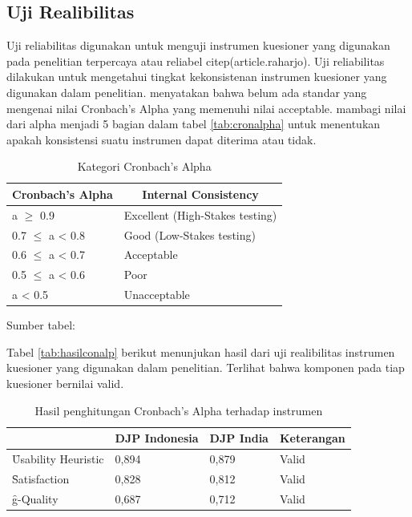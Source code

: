 \subsection{Uji Realibilitas}
Uji reliabilitas digunakan untuk menguji instrumen kuesioner yang digunakan pada penelitian terpercaya atau reliabel citep(article.raharjo). Uji reliabilitas dilakukan untuk mengetahui tingkat kekonsistenan instrumen kuesioner yang digunakan dalam penelitian. \citet{} menyatakan bahwa belum ada standar yang mengenai nilai Cronbach's Alpha yang memenuhi nilai acceptable. \citet{} mambagi nilai dari alpha menjadi 5 bagian dalam tabel \ref{tab:cronalpha} untuk menentukan apakah konsistensi suatu instrumen dapat diterima atau tidak.
\begin{table}
	\centering
	\caption{Kategori Cronbach's Alpha}
	\begin{tabular}{|l|l|}
		\hline
		\multicolumn{1}{|c|}{\bf Cronbach's Alpha} & \multicolumn{1}{c|}{{\bf Internal Consistency}} \\ \hline
		a $\geq$ 0.9 & Excellent (High-Stakes testing) \\ \hline
		0.7 $\leq$ a < 0.8 & Good (Low-Stakes testing) \\ \hline
		0.6 $\leq$ a < 0.7 & Acceptable  \\ \hline
		0.5 $\leq$ a < 0.6 & Poor   \\ \hline
		a < 0.5           & Unacceptable  \\ \hline 
	\end{tabular}
		\begin{center}
			{\small Sumber tabel: \citep{buku.george}}
		\end{center}
\end{table}
Tabel \ref{tab:hasilconalp} berikut menunjukan hasil dari uji realibilitas instrumen kuesioner yang digunakan dalam penelitian. Terlihat bahwa komponen pada tiap kuesioner bernilai valid.
\begin{table}
	\centering
	\caption{Hasil penghitungan Cronbach's Alpha terhadap instrumen}
	\begin{tabular}{|l|l|l|l|}
		\cline{2-4}
		\multicolumn{1}{c|}{} &
		\multicolumn{1}{l|}{\bf DJP Indonesia} &
		\multicolumn{1}{l|}{\bf DJP India} &
		\multicolumn{1}{l|}{{\bf Keterangan}} \\ \hline
		\f{Usability Heuristic} & 0,894
		 & 0,879 & Valid \\ \hline
		\f{Satisfaction} & 0,828
		& 0,812 & Valid \\ \hline
		\f{g-Quality} & 0,687
		 & 0,712 & Valid \\ \hline
	\end{tabular}
\end{table}
